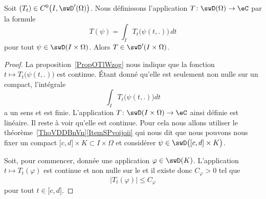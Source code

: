 \begin{proposition} \label{PropLKtBsVi}
    Soit \( (T_t)\in C^0\big( I,\swD'(\Omega) \big)\). Nous définissons l'application \( T\colon \swD(\Omega)\to \eC\) par la formule
    \begin{equation}
       T(\psi)=\int_I T_t\big( \psi(t,.) \big)\,dt
    \end{equation}
    pour tout \( \psi\in\swD(I\times \Omega)\). Alors \( T\in \swD'(I\times \Omega)\).
\end{proposition}

\begin{proof}
    La proposition~\ref{PropOTlWzog} nous indique que la fonction \( t\mapsto T_t\big( \psi(t,.) \big)\) est continue. Étant donné qu'elle est seulement non nulle sur un compact, l'intégrale
    \begin{equation}
        \int_IT_t\big( \psi(t,.) \big)dt
    \end{equation}
    a un sens et est finie. L'application \( T\colon \swD(I\times \Omega)\to \eC\) ainsi définie est linéaire. Il reste à voir qu'elle est continue. Pour cela nous allons utiliser le théorème~\ref{ThoVDDBnVn}\ref{ItemSPvoijoii} qui nous dit que nous pouvons nous fixer un compact \( \mathopen[ c , d \mathclose]\times K\subset I\times\Omega\) et considérer \( \psi\in \swD\big( \mathopen[ c , d \mathclose]\times K \big)\).

    Soit, pour commencer, donnée une application \( \varphi\in\swD(K)\). L'application \( t\mapsto T_t(\varphi)\) est continue et non nulle sur le  et il existe donc \( C_{\varphi}>0\) tel que
    \begin{equation}
        | T_t(\varphi) |\leq C_{\varphi}
    \end{equation}
    pour tout \( t\in\mathopen[ c , d \mathclose]\).


\end{proof}
